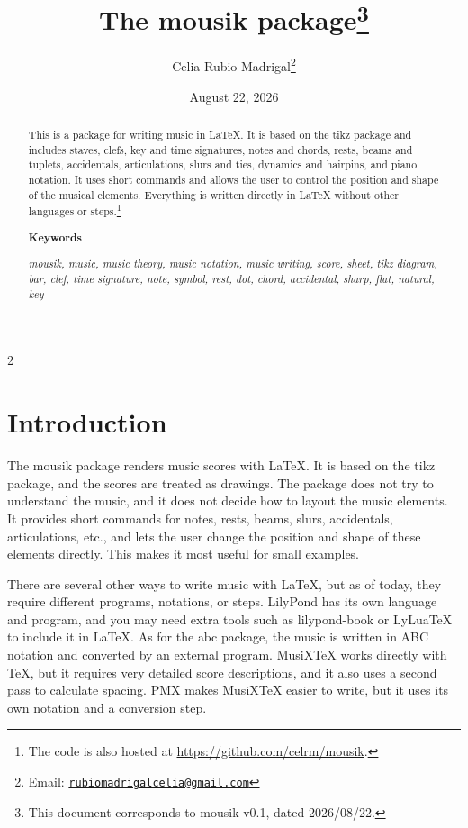\documentclass[final]{article}
\title{The \textsf{mousik} package\footnote{This
		document corresponds to \textsf{mousik} v0.1, dated 2026/08/22.}}
\author{Celia Rubio Madrigal\footnote{Email: \href{mailto:rubiomadrigalcelia@gmail.com}{\texttt{rubiomadrigalcelia@gmail.com}}}}
\date{August 22, 2026}
\begin{document}
	
	\maketitle
	
	\begin{abstract}
        This is a package for writing music in \LaTeX{}. It is based on the \textsf{tikz} package and includes staves, clefs, key and time signatures, notes and chords, rests, beams and tuplets, accidentals, articulations, slurs and ties, dynamics and hairpins, and piano notation. It uses short commands and allows the user to control the position and shape of the musical elements. Everything is written directly in \LaTeX{} without other languages or steps.\footnote{The code is also hosted at \href{https://github.com/celrm/mousik}{https://github.com/celrm/mousik}.}
        
        \begin{center}
            \textbf{Keywords}
        \end{center}
        
        \textit{mousik, music, music theory, music notation, music writing, score, sheet, tikz diagram, bar, clef, time signature, note, symbol, rest, dot, chord, accidental, sharp, flat, natural, key}
    \end{abstract}

	\vfill
	\begin{multicols}{2}
		\tableofcontents
	\end{multicols}
	\vfill
	
	\section{Introduction}\label{intro}

    The \textsf{mousik} package renders music scores with \LaTeX{}. It is based on the \textsf{tikz} package, and the scores are treated as drawings. The package does not try to understand the music, and it does not decide how to layout the music elements. It provides short commands for notes, rests, beams, slurs, accidentals, articulations, etc., and lets the user change the position and shape of these elements directly. This makes it most useful for small examples.

    There are several other ways to write music with \LaTeX{}, but as of today, they require different programs, notations, or steps. \textsf{LilyPond} has its own language and program, and you may need extra tools such as \textsf{lilypond-book} or \textsf{LyLuaTeX} to include it in \LaTeX{}. As for the \textsf{abc} package, the music is written in ABC notation and converted by an external program. \textsf{MusiXTeX} works directly with TeX, but it requires very detailed score descriptions, and it also uses a second pass to calculate spacing. \textsf{PMX} makes MusiXTeX easier to write, but it uses its own notation and a conversion step.
\end{document}
